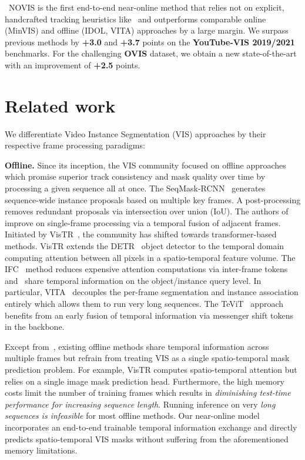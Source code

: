 \documentclass{article}
\newcommand{\method}{\mbox{NOVIS}}
\theoremstyle{plain}
\theoremstyle{definition}
\theoremstyle{remark}
\begin{document}
~\method{} is the first end-to-end near-online method that relies not on explicit, handcrafted tracking heuristics like~\cite{IFC, devis} and outperforms comparable online (MinVIS) and offline (IDOL, VITA) 
approaches by a large margin.
We surpass previous methods by \textbf{+3.0} and \textbf{+3.7} points on the \textbf{YouTube-VIS 2019/2021} benchmarks.
For the challenging \textbf{OVIS} dataset, we obtain a new state-of-the-art with an improvement of \textbf{+2.5} points.















 \section{Related work}

We differentiate Video Instance Segmentation (VIS) approaches by their respective frame processing paradigms:



\noindent \textbf{Offline.}
Since its inception, the VIS community focused on offline approaches which promise superior track consistency and mask quality over time by processing a given sequence all at once.
The SeqMask-RCNN~\cite{prop_reduce} generates sequence-wide instance proposals based on multiple key frames.
A post-processing removes redundant proposals via intersection over union (IoU).
The authors of~\cite{stmask} improve on single-frame processing via a temporal fusion of adjacent frames.
Initiated by VisTR~\cite{vistr}, the community has shifted towards transformer-based methods.
VisTR extends the DETR~\cite{DETR} object detector to the temporal domain computing attention between all pixels in a spatio-temporal feature volume.
The IFC~\cite{IFC} method reduces expensive attention computations via inter-frame tokens and~\cite{seqformer, heo2022vita, mask2former4vis} share temporal information on the object/instance query level.
In particular, VITA~\cite{heo2022vita} decouples the per-frame segmentation and instance association entirely which allows them to run very long sequences.
The TeViT~\cite{yang2022tevit} approach benefits from an early fusion of temporal information via messenger shift 
tokens in the backbone.

Except from~\cite{mask2former4vis}, existing offline methods share temporal information across multiple frames but refrain from treating VIS as a single spatio-temporal mask prediction problem.
For example, VisTR computes spatio-temporal attention but relies on a single image mask prediction head.
Furthermore, the high memory costs limit the number of training frames which results in \emph{diminishing test-time performance for increasing sequence length}.
Running inference on very \emph{long sequences is infeasible} for most offline methods.
Our near-online model incorporates an end-to-end trainable temporal information exchange and directly predicts spatio-temporal VIS masks without suffering from the aforementioned memory limitations.
\end{document}
